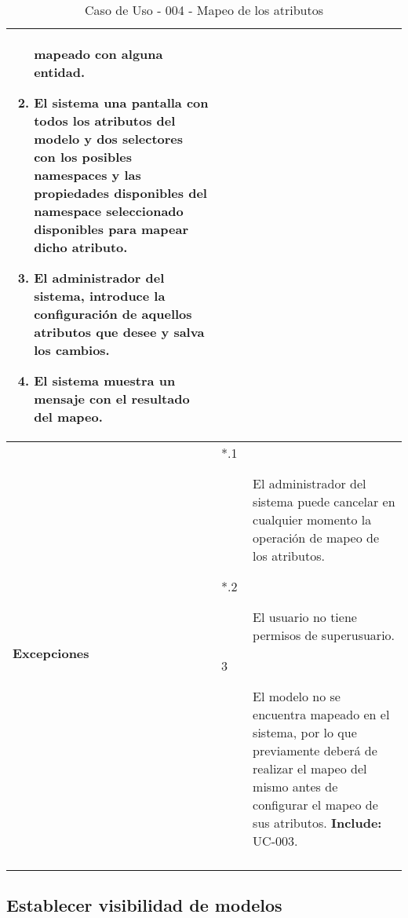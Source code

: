 \begin{center}
\begin{longtable}{||p{3.4cm}|p{12cm}||}
\begin{enumerate}
                       mapeado con alguna entidad.
                \item El sistema una pantalla con todos los atributos del modelo
                       y dos selectores con los posibles namespaces y las
                       propiedades disponibles del namespace seleccionado
                       disponibles para mapear dicho atributo.
                \item El administrador del sistema, introduce la configuración
                       de aquellos atributos que desee y salva los cambios.
                \item El sistema muestra un mensaje con el resultado del mapeo.
             \end{enumerate}\\
 \hline \bf Excepciones &
             \begin{description}
                \item[*.1] El administrador del sistema puede cancelar en
                          cualquier momento la operación de mapeo de los
                          atributos.
                \item[*.2] El usuario no tiene permisos de superusuario.
                \item[3] El modelo no se encuentra mapeado en el sistema, por lo
                          que previamente deberá de realizar el mapeo del mismo
                          antes de configurar el mapeo de sus atributos.
                          \textbf{Include:} UC-003.
             \end{description}\\
\hline
\hline
\caption{\label{tab:caso004} Caso de Uso - 004 - Mapeo de los atributos} 
\end{longtable}
\end{center}


\subsection{Establecer visibilidad de modelos}

